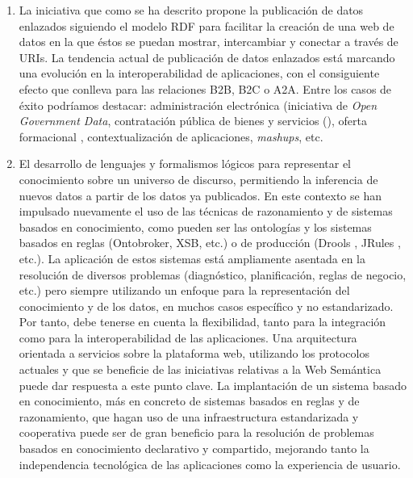 \begin{enumerate}
 \item La iniciativa \linkeddata que como se ha descrito propone la publicación de datos
enlazados siguiendo el modelo \gls{RDF} para facilitar la creación de una web de
datos en la que éstos se puedan mostrar, intercambiar y conectar a través de
URIs. La tendencia actual de publicación de datos enlazados está marcando una
evolución en la interoperabilidad de aplicaciones, con el consiguiente efecto que
conlleva para las relaciones \gls{B2B}, \gls{B2C} o \gls{A2A}. Entre los casos de éxito
podríamos destacar: administración electrónica (iniciativa de \textit{Open Government
Data}, contratación pública de bienes y servicios (\eproc), oferta formacional , contextualización de aplicaciones, \textit{mashups},
etc. 

\item El desarrollo de lenguajes y formalismos lógicos para representar el conocimiento sobre un universo de discurso, permitiendo la inferencia de nuevos
datos a partir de los datos ya publicados. En este contexto se han impulsado nuevamente el uso de las técnicas de razonamiento y de sistemas basados en conocimiento, 
como pueden ser las ontologías y los sistemas basados en reglas (Ontobroker, XSB, etc.) o de producción (Drools , JRules , etc.). 
La aplicación de estos sistemas está ampliamente asentada en la resolución de diversos problemas
(diagnóstico, planificación, reglas de negocio, etc.) pero siempre utilizando un enfoque para la representación del conocimiento y de los datos, en muchos casos
específico y no estandarizado. Por tanto, debe tenerse en cuenta la flexibilidad, tanto para la integración como para la interoperabilidad de las aplicaciones. Una arquitectura orientada a
servicios sobre la plataforma web, utilizando los protocolos actuales y que se beneficie de las iniciativas relativas a la Web Semántica puede dar respuesta a
este punto clave. La implantación de un sistema basado en conocimiento, más en concreto de
sistemas basados en reglas y de razonamiento, que hagan uso de una infraestructura estandarizada y cooperativa puede ser de gran beneficio para la
resolución de problemas basados en conocimiento declarativo y compartido, mejorando tanto la independencia tecnológica de las aplicaciones como la experiencia de usuario.
\end{enumerate}


